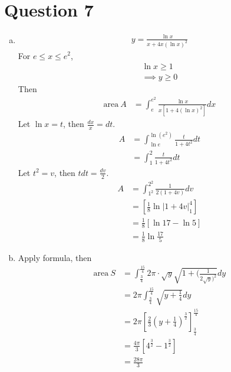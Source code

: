 \documentclass[11pt]{article}
\begin{document}
\section*{Question 7}
\begin{enumerate}[(a)]
    \item
    \begin{align*}
        y = \frac{\ln{x}}{x+4x(\ln{x})^2}
    \end{align*}
    For $e \leq x \leq e^2$, 
    \begin{align*}
        \ln{x} \geq 1 \\
        \implies y \geq 0
    \end{align*}
    Then 
    \begin{align*}
        \text{area} \ A &= \int_{e}^{e^2} \frac{\ln{x}}{x[1+4(\ln{x})^2]} dx
    \end{align*}
    Let $\ln{x}=t$, then $\displaystyle \frac{dx}{x}=dt.$
    \begin{align*}
        A &= \int_{\ln{e}}^{\ln{(e^2)}} \frac{t}{1+4t^2} dt \\
        &= \int_{1}^2 \frac{t}{1+4t^2}dt
    \end{align*}
    Let $t^2 = v$, then $\displaystyle tdt = \frac{dv}{2}$.
    \begin{align*}
        A&= \int_{1^2}^{2^2} \frac{1}{2(1+4v)}dv \\
        &= \left[ \frac{1}{8}\ln{\lvert 1 + 4v \rvert}_1^4 \right] \\
        &= \frac{1}{8} \left[\ln{17}-\ln{5}\right]\\
        &= \frac{1}{8}\ln{\frac{17}{5}}
    \end{align*}
    \item 
    Apply formula, then 
    \begin{align*}
        \text{area} \ S  &= \int_{\frac{3}{4}}^{\frac{15}{4}} 2\pi \cdot \sqrt{y} \sqrt{1+(\frac{1}{2\sqrt{y})^2}} dy \\ 
        &= 2\pi \int_{\frac{3}{4}}^{\frac{15}{4}} \sqrt{y+\frac{1}{4}} dy \\
        &= 2\pi \left[\frac{2}{3}(y+\frac{1}{4})^\frac{3}{2}\right]_{\frac{3}{4}}^\frac{15}{4}\\
        &= \frac{4\pi}{3}\left[4^{\frac{3}{2}}-1^{\frac{3}{2}}\right]\\
        &= \frac{28\pi}{3}
    \end{align*}
\end{enumerate}
\newpage
\end{document}
